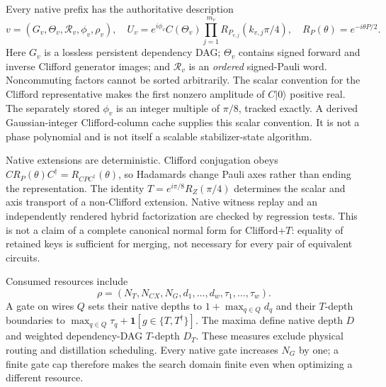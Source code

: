 \documentclass[11pt]{article}
\newcommand{\ket}[1]{\lvert #1\rangle}
\newcommand{\R}{\mathcal R}
\begin{document}
Every native prefix has the authoritative description
\begin{equation}
 v=(G_v,\Theta_v,\R_v,\phi_v,\rho_v),\quad
 U_v=e^{i\phi_v}C(\Theta_v)\prod_{j=1}^{m_v}R_{P_{v,j}}(k_{v,j}\pi/4),\quad
 R_P(\theta)=e^{-i\theta P/2}.
 \label{eq:hybrid}
\end{equation}
Here $G_v$ is a lossless persistent dependency DAG; $\Theta_v$ contains signed forward and inverse Clifford generator images; and $\R_v$ is an \emph{ordered} signed-Pauli word. Noncommuting factors cannot be sorted arbitrarily. The scalar convention for the Clifford representative makes the first nonzero amplitude of $C\ket{0}$ positive real. The separately stored $\phi_v$ is an integer multiple of $\pi/8$, tracked exactly. A derived Gaussian-integer Clifford-column cache supplies this scalar convention. It is not a phase polynomial and is not itself a scalable stabilizer-state algorithm.

Native extensions are deterministic. Clifford conjugation obeys $C R_P(\theta)C^\dagger=R_{CPC^\dagger}(\theta)$, so Hadamards change Pauli axes rather than ending the representation. The identity $T=e^{i\pi/8}R_Z(\pi/4)$ determines the scalar and axis transport of a non-Clifford extension. Native witness replay and an independently rendered hybrid factorization are checked by regression tests. This is not a claim of a complete canonical normal form for Clifford+$T$: equality of retained keys is sufficient for merging, not necessary for every pair of equivalent circuits.

Consumed resources include
\begin{equation}
 \rho=(N_T,N_{CX},N_G,d_1,\ldots,d_w,\tau_1,\ldots,\tau_w).
\end{equation}
A gate on wires $Q$ sets their native depths to $1+\max_{q\in Q}d_q$ and their $T$-depth boundaries to $\max_{q\in Q}\tau_q+\mathbf1[g\in\{T,T^\dagger\}]$. The maxima define native depth $D$ and weighted dependency-DAG $T$-depth $D_T$. These measures exclude physical routing and distillation scheduling. Every native gate increases $N_G$ by one; a finite gate cap therefore makes the search domain finite even when optimizing a different resource.
\end{document}
